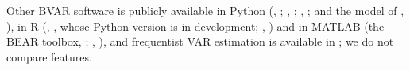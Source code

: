 Other BVAR software is publicly available in Python (, \citealp{chan2026bvartoolkitpython}; , \citealp{pinder2026impulso}; , \citealp{shaw2026srvar}; and the  model of , \citealp{pymc2026extras}), in R (, \citealp{kim2026bvhar}, whose Python version is in development; , \citealp{boeck2022bgvar}) and in MATLAB (the BEAR toolbox, \citealp{dieppe2016bear}; , \citealp{chan2026bvartoolkit}), and frequentist VAR estimation is available in  \citep{seabold2010statsmodels}; we do not compare features. %


